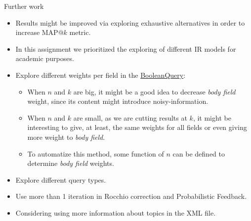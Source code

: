 \documentclass[10pt]{beamer}
\begin{document}
\begin{frame}{Further work}
    \begin{itemize}
        \item Results might be improved via exploring exhaustive alternatives in order to increase MAP$@k$ metric. 
        \item In this assignment we prioritized the exploring of different IR models for academic purposes.
        \item Explore different weights per field in the \href{https://lucene.apache.org/core/8_9_0/core/org/apache/lucene/search/BooleanQuery.html}{BooleanQuery}:
        \begin{itemize}
            \item When $n$ and $k$ are big, it might be a good idea to decrease \textit{body field} weight, since its content might introduce noisy-information.
            \item When $n$ and $k$ are small, as we are cutting results at $k$, it might be interesting to give, at least, the same weights for all fields or even giving more weight to \textit{body field}.
            \item To automatize this method, some function of $n$ can be defined to determine \textit{body field} weights.
        \end{itemize}
        \item Explore different query types. 
        \item Use more than 1 iteration in Rocchio correction and Probabilistic Feedback.
        \item Considering using more information about topics in the XML file.
    \end{itemize}
    
\end{frame}


\begin{frame}
    
    
\end{frame}
\end{document}
